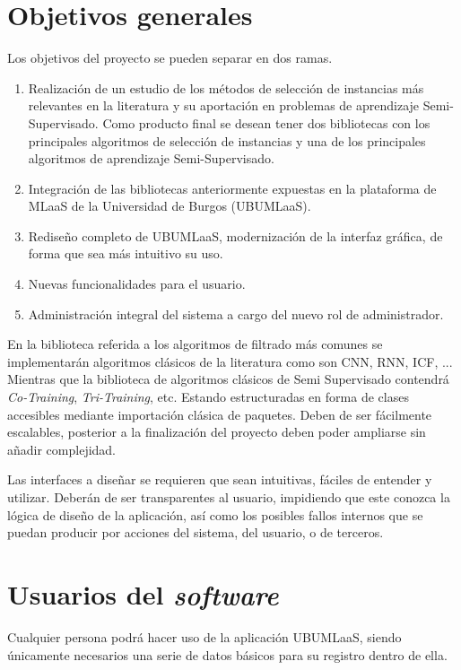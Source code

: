 \section{Objetivos generales}\label{objetivos-generales}
Los objetivos del proyecto se pueden separar en dos ramas.
\begin{enumerate}
\item Realización de un estudio de los métodos de selección de instancias más relevantes en la literatura y su aportación en problemas de aprendizaje Semi-Supervisado. Como producto final se desean tener dos bibliotecas con los principales algoritmos de selección de instancias y una de los principales algoritmos de aprendizaje Semi-Supervisado.
\item Integración de las bibliotecas anteriormente expuestas en la plataforma de MLaaS de la Universidad de Burgos (UBUMLaaS).
\item Rediseño completo de UBUMLaaS, modernización de la interfaz gráfica, de forma que sea más intuitivo su uso.
\item Nuevas funcionalidades para el usuario.
\item Administración integral del sistema a cargo del nuevo rol de administrador.
\end{enumerate}

En la biblioteca referida a los algoritmos de filtrado más comunes se implementarán algoritmos clásicos de la literatura como son CNN, RNN, ICF, ... Mientras que la biblioteca de algoritmos clásicos de Semi Supervisado contendrá \textit{Co-Training}, \textit{Tri-Training}, etc. Estando estructuradas en forma de clases accesibles mediante importación clásica de paquetes. Deben de ser fácilmente escalables, posterior a la finalización del proyecto deben poder ampliarse sin añadir complejidad.

Las interfaces a diseñar se requieren que sean intuitivas, fáciles de entender y utilizar. Deberán de ser transparentes al usuario, impidiendo que este conozca la lógica de diseño de la aplicación, así como los posibles fallos internos que se puedan producir por acciones del sistema, del usuario, o de terceros.


\section{Usuarios del \textit{software}}\label{usuarios-participantes-software}
Cualquier persona podrá hacer uso de la aplicación UBUMLaaS, siendo únicamente necesarios una serie de datos básicos para su registro dentro de ella. 

